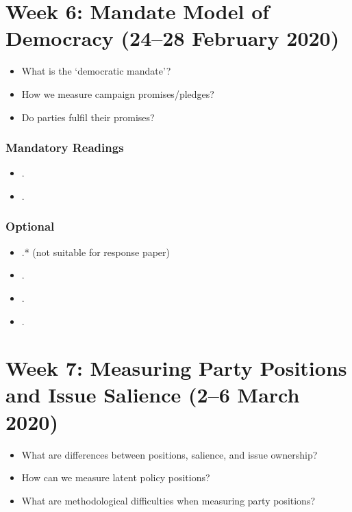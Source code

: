 \documentclass[abstract=on,parskip=full,headings=standardclasses,fontsize=11pt,paper=a4]{scrartcl}
\begin{document}




\section{Week 6:  Mandate Model of Democracy (24--28 February 2020)}


\begin{itemize}
\renewcommand\labelitemi{--}
\item What is the `democratic mandate'? 
\item How we measure campaign promises/pledges?
\item Do parties fulfil their promises?
\end{itemize}

\subsubsection*{Mandatory Readings}
\begin{itemize}
\item {}.
\item {}.
\end{itemize}

\subsubsection*{Optional}
\begin{itemize}
\item {}.* (not suitable for response paper)
\item {}.
\item {}.
\item {}.
\end{itemize}




\section{Week 7:   Measuring Party Positions and Issue Salience (2--6 March 2020)}


\begin{itemize}
\renewcommand\labelitemi{--}
\item What are differences between positions, salience, and issue ownership?
\item How can we measure latent policy positions? 
\item What are methodological difficulties when measuring party positions?
\end{itemize}
\end{document}
